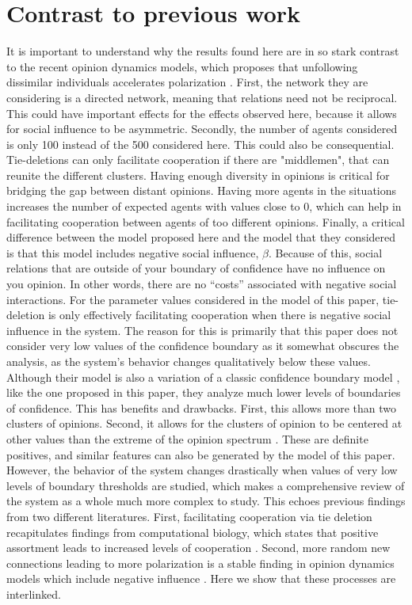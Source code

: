 \documentclass{article}
\begin{document}
\section{Contrast to previous work}
It is important to understand why the results found here are in so stark contrast to the recent opinion dynamics models, which proposes that unfollowing dissimilar individuals accelerates polarization \cite{sasahara_social_2021}. First, the network they are considering is a directed network, meaning that relations need not be reciprocal. This could have important effects for the effects observed here, because it allows for social influence to be asymmetric. Secondly, the number of agents considered is only 100 instead of the 500 considered here. This could also be consequential. Tie-deletions can only facilitate cooperation if there are "middlemen", that can reunite the different clusters. Having enough diversity in opinions is critical for bridging the gap between distant opinions. Having more agents in the situations increases the number of expected agents with values close to 0, which can help in facilitating cooperation between agents of too different opinions. Finally, a critical difference between the model proposed here and the model that they considered is that this model includes negative social influence, $\beta$. Because of this, social relations that are outside of your boundary of confidence have no influence on you opinion. In other words, there are no “costs” associated with negative social interactions. For the parameter values considered in the model of this paper, tie-deletion is only effectively facilitating cooperation when there is negative social influence in the system. The reason for this is primarily that this paper does not consider very low values of the confidence boundary as it somewhat obscures the analysis, as the system’s behavior changes qualitatively below these values. Although their model is also a variation of a classic confidence boundary model \cite{flache_models_2017, sirbu2017opinion}, like the one proposed in this paper, they analyze much lower levels of boundaries of confidence. This has benefits and drawbacks. First, this allows more than two clusters of opinions. Second, it allows for the clusters of opinion to be centered at other values than the extreme of the opinion spectrum \cite{sasahara_social_2021}. These are definite positives, and similar features can also be generated by the model of this paper. However, the behavior of the system changes drastically when values of very low levels of boundary thresholds are studied, which makes a comprehensive review of the system as a whole much more complex to study.  
This echoes previous findings from two different literatures. First, facilitating cooperation via tie deletion recapitulates findings from computational biology, which states that positive assortment leads to increased levels of cooperation \cite{boyd_coordinated_2010,dakin_dynamic_2018, pepper_mechanism_2002,santos_cooperation_2006}. Second, more random new connections leading to more polarization is a stable finding in opinion dynamics models which include negative influence \cite{flache_why_2006,flache_small_2011,turner_paths_2018}. Here we show that these processes are interlinked.  
\end{document}
